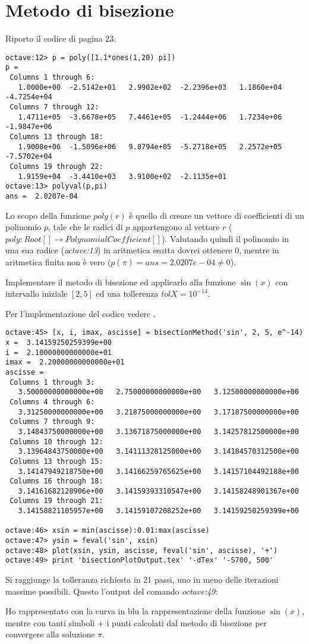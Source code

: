 \section{Metodo di bisezione}
\label{sec:metodoDiBisezione}
Riporto il codice di pagina 23:
\begin{lstlisting}
octave:12> p = poly([1.1*ones(1,20) pi])
p =
 Columns 1 through 6:
   1.0000e+00  -2.5142e+01   2.9902e+02  -2.2396e+03   1.1860e+04  -4.7254e+04
 Columns 7 through 12:
   1.4711e+05  -3.6678e+05   7.4461e+05  -1.2444e+06   1.7234e+06  -1.9847e+06
 Columns 13 through 18:
   1.9008e+06  -1.5096e+06   9.8794e+05  -5.2718e+05   2.2572e+05  -7.5702e+04
 Columns 19 through 22:
   1.9159e+04  -3.4410e+03   3.9100e+02  -2.1135e+01
octave:13> polyval(p,pi)
ans =  2.0207e-04
\end{lstlisting}
Lo scopo della funzione $poly(r)$ \`e quello di creare un vettore di coefficienti
di un polinomio $p$, tale che le radici di $p$ appartengono al vettore $r$ 
($poly: Root[] \rightarrow PolynomialCoefficient[]$).
Valutando quindi il polinomio in una sua radice (\emph{octave:13}) in aritmetica
esatta dovrei ottenere 0, mentre in aritmetica finita non \`e vero 
($p(\pi) = ans =  2.0207e-04 \not = 0$).

\begin{exercise}
Implementare il metodo di bisezione ed applicarlo alla funzione $\sin(x)$ 
con intervallo iniziale $[2, 5]$ ed una tollerenza $tolX = 10^{-14}$.
\end{exercise}
Per l'implementazione del codice vedere .
\begin{lstlisting}
octave:45> [x, i, imax, ascisse] = bisectionMethod('sin', 2, 5, e^-14)
x =  3.14159250259399e+00
i =  2.10000000000000e+01
imax =  2.20000000000000e+01
ascisse =
 Columns 1 through 3:
   3.50000000000000e+00   2.75000000000000e+00   3.12500000000000e+00
 Columns 4 through 6:
   3.31250000000000e+00   3.21875000000000e+00   3.17187500000000e+00
 Columns 7 through 9:
   3.14843750000000e+00   3.13671875000000e+00   3.14257812500000e+00
 Columns 10 through 12:
   3.13964843750000e+00   3.14111328125000e+00   3.14184570312500e+00
 Columns 13 through 15:
   3.14147949218750e+00   3.14166259765625e+00   3.14157104492188e+00
 Columns 16 through 18:
   3.14161682128906e+00   3.14159393310547e+00   3.14158248901367e+00
 Columns 19 through 21:
   3.14158821105957e+00   3.14159107208252e+00   3.14159250259399e+00

octave:46> xsin = min(ascisse):0.01:max(ascisse)
octave:47> ysin = feval('sin', xsin)
octave:48> plot(xsin, ysin, ascisse, feval('sin', ascisse), '+')
octave:49> print 'bisectionPlotOutput.tex' '-dTex' '-S700, 500'
\end{lstlisting}
Si raggiunge la tolleranza richiesta in 21 passi, uno in meno delle iterazioni
massime possibili. Questo l'output del comando \emph{octave:49}:
\begin{center}

\end{center}
Ho rappresentato con la curva in blu la rappresentazione della funzione 
$\sin(x)$, mentre con tanti simboli $+$ i punti calcolati dal metodo di
bisezione per convergere alla soluzione $\pi$.
